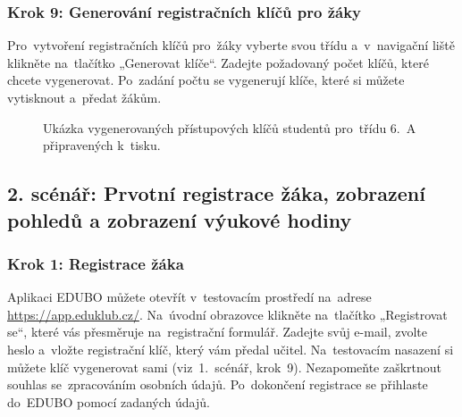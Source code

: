 \documentclass[male,czech,api_bc]{kitheses}
\begin{document}
\subsubsection{Krok 9: Generování registračních klíčů pro žáky}
Pro~vytvoření registračních klíčů pro~žáky vyberte svou třídu a~v~navigační liště klikněte na~tlačítko „Generovat klíče“. Zadejte požadovaný počet klíčů, které chcete vygenerovat. Po~zadání počtu se vygenerují klíče, které si můžete vytisknout a~předat žákům.

\begin{figure}[H]
	\centering
	\caption{Ukázka vygenerovaných přístupových klíčů studentů pro~třídu 6.~A připravených k~tisku.}
	\label{fig:manual-5}
\end{figure}

\subsection{2. scénář: Prvotní registrace žáka, zobrazení pohledů a zobrazení výukové hodiny}

\subsubsection{Krok 1: Registrace žáka}
Aplikaci EDUBO můžete otevřít v~testovacím prostředí na~adrese \url{https://app.eduklub.cz/}. Na~úvodní obrazovce klikněte na~tlačítko „Registrovat se“, které vás přesměruje na~registrační formulář. Zadejte svůj e-mail, zvolte heslo a~vložte registrační klíč, který vám předal učitel. Na~testovacím nasazení si můžete klíč vygenerovat sami (viz~1.~scénář, krok~9). Nezapomeňte zaškrtnout souhlas se~zpracováním osobních údajů. Po~dokončení registrace se přihlaste do~EDUBO pomocí zadaných údajů.

\newpage
\end{document}
